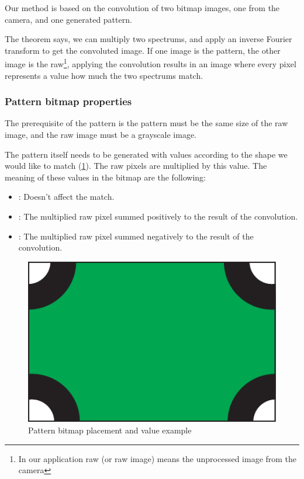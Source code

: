 Our method is based on the convolution of two bitmap images, one from the camera, and one generated pattern.

The theorem says, we can multiply two spectrums, and apply an inverse Fourier transform to get the convoluted image. If one image is the pattern, the other image is the raw\footnote{In our application raw (or raw image) means the unprocessed image from the camera}, applying the convolution results in an image where every pixel represents a value how much the two spectrums match.

\subsubsection{Pattern bitmap properties}

The prerequisite of the pattern is the pattern must be the same size of the raw image, and the raw image must be a grayscale image.

The pattern itself needs to be generated with values according to the shape we would like to match (\cref{fig:case_study:convoluter_image}). The raw pixels are multiplied by this value. The meaning of these values in the bitmap are the following: 
\begin{itemize}
	\item {}: Doesn't affect the match.
	\item {}: The multiplied raw pixel summed positively to the result of the convolution.
	\item {}: The multiplied raw pixel summed negatively to the result of the convolution.
\end{itemize}

\begin{figure}[h]
	\centering
	\includegraphics[valign=c,width=.5\linewidth]{include/figures/chapter_6/math_2}
	\caption{Pattern bitmap placement and value example}
	\label{fig:case_study:convoluter_image}
\end{figure}

